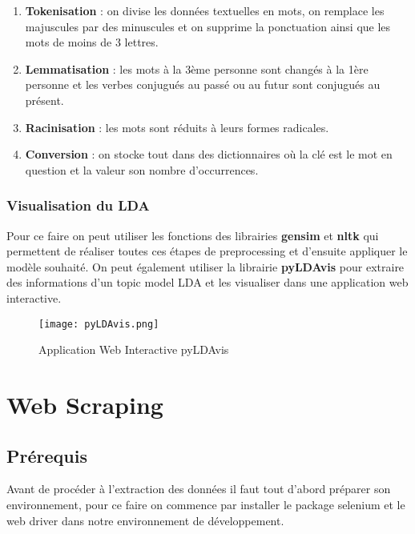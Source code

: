 \documentclass[a4paper,french,12pt]{article}
\begin{document}
\begin{enumerate}
    \item \textbf{Tokenisation} : on divise les données textuelles en mots, on remplace les majuscules par des minuscules et on supprime la ponctuation ainsi que les mots de moins de 3 lettres.\\
    \item \textbf{Lemmatisation} : les mots à la 3ème personne sont changés à la 1ère personne et les verbes conjugués au passé ou au futur sont conjugués au présent.\\
    \item \textbf{Racinisation} : les mots sont réduits à leurs formes radicales.\\
    \item \textbf{Conversion} : on stocke tout dans des dictionnaires où la clé est le mot en question et la valeur son nombre d'occurrences.\\
\end{enumerate}

\subsubsection{Visualisation du LDA}

Pour ce faire on peut utiliser les fonctions des librairies \textbf{gensim} et \textbf{nltk} qui permettent de réaliser toutes ces étapes de preprocessing et d'ensuite appliquer le modèle souhaité. On peut également utiliser la librairie \textbf{pyLDAvis} pour extraire des informations d’un topic model LDA et les visualiser dans une application web interactive.\\

\begin{figure}[!h]
    \centering
    \texttt{[image: pyLDAvis.png]}
    \caption{Application Web Interactive pyLDAvis}
\end{figure}

\section{Web Scraping}
\label{sec:Web Scraping}

\subsection{Prérequis}

Avant de procéder à l'extraction des données il faut tout d'abord préparer son environnement, pour ce faire on commence par installer le package selenium et le web driver dans notre environnement de développement.\\
\end{document}
